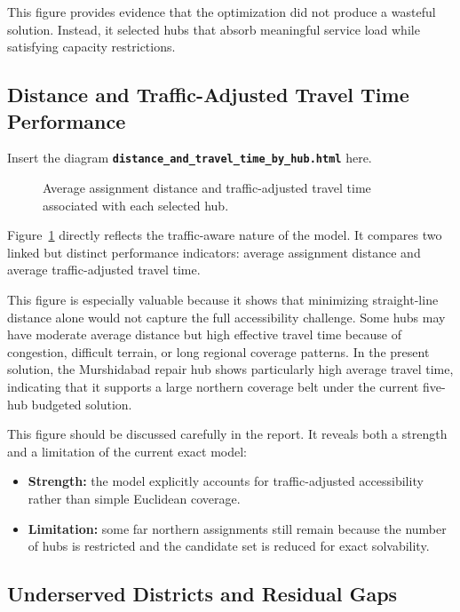 This figure provides evidence that the optimization did not produce a wasteful solution. Instead, it selected hubs that absorb meaningful service load while satisfying capacity restrictions.

\subsection{Distance and Traffic-Adjusted Travel Time Performance}

Insert the diagram \textbf{\texttt{distance\_and\_travel\_time\_by\_hub.html}} here.

\begin{figure}[h!]
\centering
\caption{Average assignment distance and traffic-adjusted travel time associated with each selected hub.}
\label{fig:gurobi_distance_travel}
\end{figure}

Figure~\ref{fig:gurobi_distance_travel} directly reflects the traffic-aware nature of the model. It compares two linked but distinct performance indicators: average assignment distance and average traffic-adjusted travel time.

This figure is especially valuable because it shows that minimizing straight-line distance alone would not capture the full accessibility challenge. Some hubs may have moderate average distance but high effective travel time because of congestion, difficult terrain, or long regional coverage patterns. In the present solution, the Murshidabad repair hub shows particularly high average travel time, indicating that it supports a large northern coverage belt under the current five-hub budgeted solution.

This figure should be discussed carefully in the report. It reveals both a strength and a limitation of the current exact model:
\begin{itemize}
    \item \textbf{Strength:} the model explicitly accounts for traffic-adjusted accessibility rather than simple Euclidean coverage.
    \item \textbf{Limitation:} some far northern assignments still remain because the number of hubs is restricted and the candidate set is reduced for exact solvability.
\end{itemize}

\subsection{Underserved Districts and Residual Gaps}

